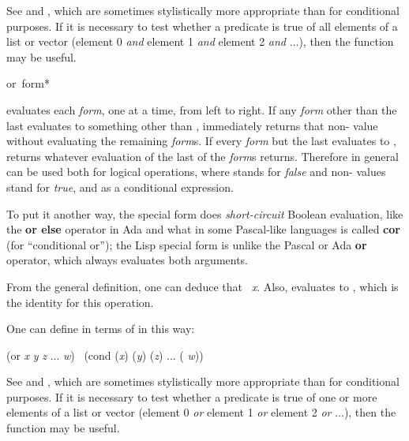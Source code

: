 \begin{defmac}
See  and , which are sometimes stylistically
more appropriate than  for conditional purposes.
If it is necessary to test whether a predicate is true
of all elements of a list or vector (element 0 {\it and} element 1 {\it and}
element 2 {\it and} $\ldots$), then the function  may be useful.
\end{defmac}

\begin{defmac}
or {\,form}*

 evaluates each {\it form}, one at a time,
from left to right.  If any {\it form} other than the last
evaluates to something other than {\false},
immediately returns that non-{\false} value without evaluating the remaining
{\it form\/}s.  If every {\it form} but the last evaluates to {\false},
 returns whatever evaluation of the last of the {\it form\/}s returns.
Therefore in general  can be used both for logical operations,
where {\false} stands for {\it false} and non-{\false} values stand for {\it true},
and as a conditional expression.

To put it another way,
the  special form does {\it short-circuit} Boolean evaluation,
like the {\bf or else} operator in Ada
and what in some Pascal-like languages is called {\bf cor} (for ``conditional
or''); the Lisp  special form is
unlike the Pascal or Ada {\bf or} operator,
which always evaluates both arguments.

From the general definition, one can deduce that
 \EQ\ {\it x}.  Also,
 evaluates to {\nil}, which is the identity for this operation.

One can define  in terms of  in this way:
\begin{lisp}
(or {\it x} {\it y} {\it z} ... {\it w}) \EQ\ (cond ({\it x}) ({\it y}) ({\it z}) ... ({\true} {\it w}))
\end{lisp}

See  and , which are sometimes
stylistically more appropriate than  for conditional purposes.
If it is necessary to test whether a predicate is true of
one or more elements of a list or vector (element 0 {\it or} element 1 {\it or}
element 2 {\it or} $\ldots$), then the function  may be useful.
\end{defmac}
